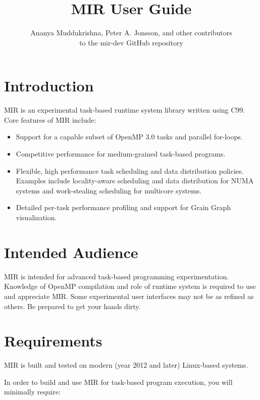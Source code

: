 \documentclass[11pt,a4paper]{article}
\title{MIR User Guide}
\author{Ananya Muddukrishna, Peter A. Jonsson, and other contributors \\ to the \textsf{mir-dev} GitHub repository}
\begin{document}
\maketitle
\tableofcontents

\section{Introduction}\label{sec:introduction}

MIR is an experimental task-based runtime system library written using C99. Core features of MIR include:

\begin{itemize}
    \item Support for a capable subset of OpenMP 3.0 tasks and parallel for-loops.
    \item Competitive performance for medium-grained task-based programs.
    \item Flexible, high performance task scheduling and data distribution policies. Examples include locality-aware scheduling and data distribution for NUMA systems and work-stealing scheduling for multicore systems.
    \item Detailed per-task performance profiling and support for Grain Graph~\cite{muddukrishna2015grain} visualization.
\end{itemize}

\section{Intended Audience}\label{sec:intended-audience}

MIR is intended for advanced task-based programming experimentation. Knowledge of OpenMP compilation and role of runtime system is required to use and appreciate MIR. Some experimental user interfaces may not be as refined as others. Be prepared to get your hands dirty.

\section{Requirements}\label{sec:installation}

MIR is built and tested on modern (year 2012 and later) Linux-based systems.

In order to build and use MIR for task-based program execution, you will minimally require:
\end{document}

